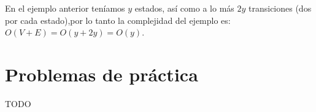 En el ejemplo anterior teníamos \(y\) estados, así como a lo más \(2y\) transiciones (dos por cada estado),por lo tanto la complejidad del ejemplo es: \(O(V+E)=O(y+2y)=O(y)\).

\section*{Problemas de práctica}

\begin{exercise}
\end{exercise}

\begin{exercise}
\end{exercise}

\begin{exercise}
\end{exercise}

\begin{exercise}
	 {TODO}
\end{exercise}